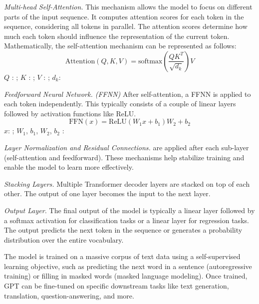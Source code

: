 
{\em Multi-head Self-Attention.} This mechanism allows the model to
focus on different parts of the input sequence. It computes attention
scores for each token in the sequence, considering all tokens in
parallel. The attention scores determine how much each token should
influence the representation of the current token. Mathematically, the
self-attention mechanism can be represented as follows:
$$\text{Attention}(Q, K, V) = \text{softmax}\left(\frac{QK^T}{\sqrt{d_k}}\right)V$$
$Q$ : ; $K$ : ; $V$ : ; $d_k$: 

{\em Feedforward Neural Network. (FFNN)} After self-attention, a FFNN is applied to each token independently. This typically consists of a couple of linear layers followed by activation functions like ReLU.
\[
\text{FFN}(x) = \text{ReLU}(W_1x + b_1)W_2 + b_2
\]
$x$: ; $W_1$, $b_1$, $W_2$, $b_2$ : 

{\em Layer Normalization and Residual Connections.} are applied after each
sub-layer (self-attention and feedforward). These mechanisms help
stabilize training and enable the model to learn more effectively.


{\em Stacking Layers.} Multiple Transformer decoder layers are stacked
on top of each other. The output of one layer becomes the input to the
next layer.

{\em Output Layer.} The final output of the model is typically a
linear layer followed by a softmax activation for classification tasks
or a linear layer for regression tasks. The output predicts the next
token in the sequence or generates a probability distribution over the
entire vocabulary.

The model is trained on a massive corpus of text data using a self-supervised learning objective, such as predicting the next word in a sentence (autoregressive training) or filling in masked words (masked language modeling). Once trained, GPT can be fine-tuned on specific downstream tasks like text generation, translation, question-answering, and more.

